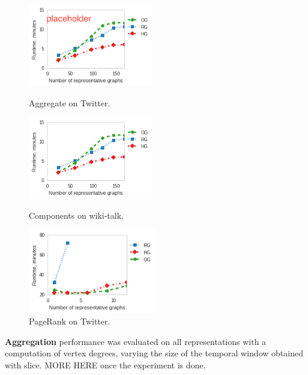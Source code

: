 \begin{figure}[t]
\centering
\begin{minipage}{2.15in}
\centering
\includegraphics[width=2.15in]{figs/deg_twitter_build14.png}
\vspace{-0.2in}
\caption{Aggregate on Twitter.}
\label{fig:degtwitter}
\vspace{-0.1in}
\end{minipage}
\begin{minipage}{2.15in}
\centering
\includegraphics[width=2.15in]{figs/cc_wikitalk_build13.png}
\vspace{-0.2in}
\caption{Components on wiki-talk.}
\label{fig:ccwiki}
\vspace{-0.1in}
\end{minipage}
\begin{minipage}{2.2in}
\centering
\includegraphics[width=2.2in]{figs/prank_twitter_build13.png}
\vspace{-0.2in}
\caption{PageRank on Twitter.}
\label{fig:pranktwitter}
\vspace{-0.1in}
\end{minipage}
\end{figure}

{\bf Aggregation} performance was evaluated on all representations
with a computation of vertex degrees, varying the size of the temporal
window obtained with slice.  MORE HERE once the experiment is done.


